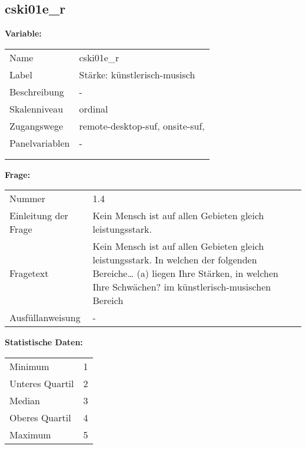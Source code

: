 	
	
	\subsection{cski01e\_r}
	\label{subSection:cski01e_r}

	\noindent\textbf{Variable:}\\
		\begin{tabular}{lL{11.3cm}}
			\label{tableVariable:cski01e_r}
			Name & cski01e\_r \\
			Label & Stärke: künstlerisch-musisch \\
			Beschreibung & - \\
			Skalenniveau & ordinal \\
			Zugangswege &
				remote-desktop-suf,
				onsite-suf,
 \\
			Panelvariablen & -
			 \\
			 \\
 \\
		\end{tabular}

		\vspace*{1 cm}
		\noindent\textbf{Frage:}\\
		\begin{tabular}{lL{11.3cm}}
			\label{tableQuestion:cski01e_r}
			Nummer & 1.4 \\
			Einleitung der Frage & Kein Mensch ist auf allen Gebieten gleich leistungsstark. \\
			Fragetext & Kein Mensch ist auf allen Gebieten gleich leistungsstark. In welchen der folgenden Bereiche…
(a) liegen Ihre Stärken, in welchen Ihre Schwächen?
im künstlerisch-musischen Bereich \\
			Ausfüllanweisung & - \\
		\end{tabular}


		\vspace*{1 cm}
		\noindent\textbf{Statistische Daten:}\\
			\begin{tabular}{ll}
				\label{tableStatistics:cski01e_r}
					Minimum & 1 \\
					Unteres Quartil & 2 \\
					Median & 3 \\
					Oberes Quartil & 4 \\
					Maximum & 5 \\
			\end{tabular}



